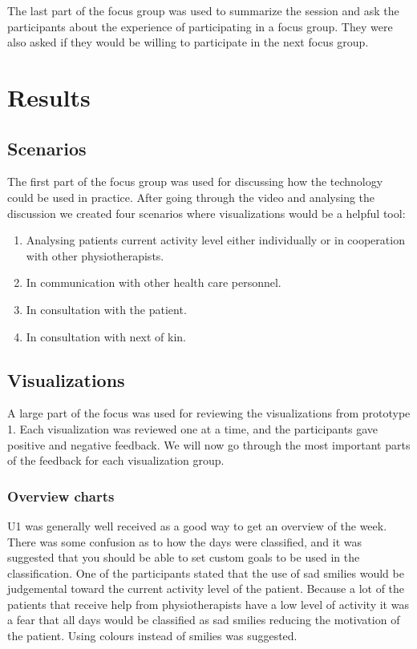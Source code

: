 The last part of the focus group was used to summarize the session and ask the participants about the experience of participating in a focus group. They were also asked if they would be willing to participate in the next focus group.

\section{Results}

\subsection{Scenarios}
The first part of the focus group was used for discussing how the technology could be used in practice. After going through the video and analysing the discussion we created four scenarios where visualizations would be a helpful tool: 
\vspace{-6mm}
\begin{enumerate}[itemsep=0cm, parsep=0cm]
\item Analysing patients current activity level either individually or in cooperation with other physiotherapists.
\item In communication with other health care personnel.
\item In consultation with the patient.
\item In consultation with next of kin.
\end{enumerate}

\subsection{Visualizations}
A large part of the focus was used for reviewing the visualizations from prototype 1. Each visualization was reviewed one at a time, and the participants gave positive and negative feedback. We will now go through the most important parts of the feedback for each visualization group.

\subsubsection{Overview charts}
U1 was generally well received as a good way to get an overview of the week. There was some confusion as to how the days were classified, and it was suggested that you should be able to set custom goals to be used in the classification. One of the participants stated that the use of sad smilies would be judgemental toward the current activity level of the patient. Because a lot of the patients that receive help from physiotherapists have a low level of activity it was a fear that all days would be classified as sad smilies reducing the motivation of the patient. Using colours instead of smilies was suggested.


